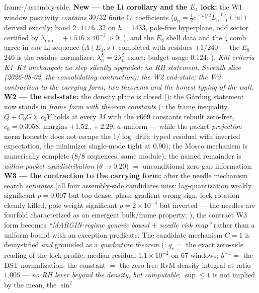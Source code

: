 frame-/assembly-side.  \textbf{New --- the Li corollary and the
$E_4$ lock:} the W1 window positivity \emph{contains} $30/32$ finite
Li coefficients ($g_n=\tfrac12e^{-|u|/2}L^{(1)}_{n-1}(|u|)$ derived
exactly; band $2..4\cup6..32$ on $h=1433$, pole-free hyperplane, odd
sector certified by $\lambda_{\min}=+1.516\times10^{-3}>0$;
), and the $E_8$ shell data and the
$\zeta$ comb agree in \emph{one} Li sequence ($\Lambda(E_4,s)$
completed with residues $\pm1/240$ --- the $E_8$ $240$ is the
residue normalizer; $\lambda_n^L=2\lambda_n^\zeta$ exact; budget
usage $0.124$; ).  \emph{Kill criteria K1--K3
unchanged; no step silently upgraded; no RH statement.}
\emph{Seventh slice (2026-08-02, the consolidating contraction): the
W2 end-state; the W3 contraction to the carrying form; two theorems
and the honest typing of the wall.}  \textbf{W2 --- the end-state:}
the density plane is closed (); the
G\aa rding statement now stands in \emph{frame form with theorem
constants} (: the frame inequality
$Q+C_0G\succeq c_0Y$ holds at every $M$ with the v669 constants
rebuilt zero-free, $c_0=0.3058$, margins $+1.52..+2.29$,
$a$-uniform --- while the packet \emph{projection} norm honestly
does not escape the $1/\log$ drift: typed residual with inverted
expectation, the minimizer single-mode tight at $0.90$); the Mosco
mechanism is numerically complete ($8/8$ sequences, same module);
the named remainder is \emph{within-packet equidistribution}
($\theta\to0.20$) $=$ unconditional zero-gap information.
\textbf{W3 --- the contraction to the carrying form:} after the
needle mechanism search \emph{saturates} (all four assembly-side
candidates miss: lag-quantization weakly significant $p=0.007$ but
too dense, phase gradient wrong sign, lock rotation cleanly killed,
pole weight significant $p=2\times10^{-4}$ but inverted --- the
needles are fourfold characterized as an emergent bulk/frame
property; ), the contract W3 form
becomes \emph{``MARGIN-regime generic bound $+$ needle risk map''}
rather than a uniform bound with an exception predicate.  The
candidate mechanism $C=1$ is demystified \emph{and} grounded as a
\emph{quadrature theorem} (: $q_r=$
the exact zero-side reading of the lock profile, median residual
$1.1\times10^{-2}$ on $67$ windows; $h^{-1}=$ the DST
normalization; the constant $=$ the zero-free RvM density integral
at ratio $1.005$ --- \emph{no RH lever beyond the density, but
computable}; $\sup\le1$ is not implied by the mean, the $\sin^2$
